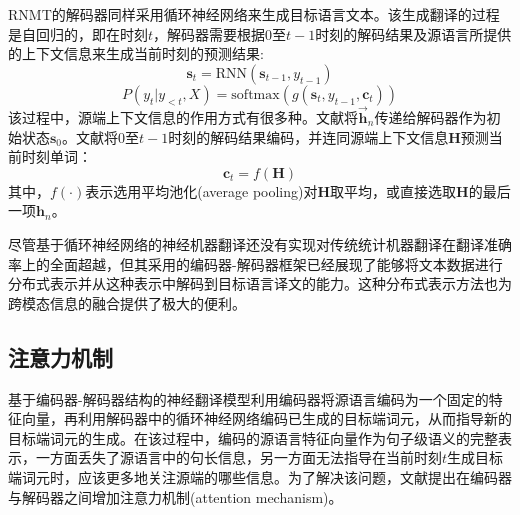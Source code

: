 RNMT的解码器同样采用循环神经网络来生成目标语言文本。该生成翻译的过程是自回归的，即在时刻$t$，解码器需要根据$0$至$t-1$时刻的解码结果及源语言所提供的上下文信息来生成当前时刻的预测结果:
\begin{equation}
    \boldsymbol{s}_t=\mathrm{RNN}(\boldsymbol{s}_{t-1},y_{t-1})
\end{equation}
\begin{equation}
    P(y_t|y_{<t},X)=\mathrm{softmax}(g(\boldsymbol{s}_t, y_{t-1}, \boldsymbol{c}_t))
\end{equation}
该过程中，源端上下文信息的作用方式有很多种。文献\cite{1_DBLP:journals/corr/SutskeverVL14}将$\overrightarrow{\boldsymbol{h}}_n$传递给解码器作为初始状态$\boldsymbol{s}_0$。文献\cite{2_cho-etal-2014-learning}将$0$至$t-1$时刻的解码结果编码，并连同源端上下文信息$\boldsymbol{H}$预测当前时刻单词：
\begin{equation}
    \boldsymbol{c}_t=f(\boldsymbol{H})
\end{equation}
其中，$f(\cdot)$表示选用平均池化(average pooling)对$\boldsymbol{H}$取平均，或直接选取$\boldsymbol{H}$的最后一项$\boldsymbol{h}_n$。

尽管基于循环神经网络的神经机器翻译还没有实现对传统统计机器翻译在翻译准确率上的全面超越，但其采用的编码器-解码器框架已经展现了能够将文本数据进行分布式表示并从这种表示中解码到目标语言译文的能力。这种分布式表示方法也为跨模态信息的融合提供了极大的便利。

\subsection{注意力机制}
基于编码器-解码器结构的神经翻译模型利用编码器将源语言编码为一个固定的特征向量，再利用解码器中的循环神经网络编码已生成的目标端词元，从而指导新的目标端词元的生成。在该过程中，编码的源语言特征向量作为句子级语义的完整表示，一方面丢失了源语言中的句长信息，另一方面无法指导在当前时刻$t$生成目标端词元时，应该更多地关注源端的哪些信息。为了解决该问题，文献\cite{3_DBLP:journals/corr/BahdanauCB14}提出在编码器与解码器之间增加注意力机制(attention mechanism)。

